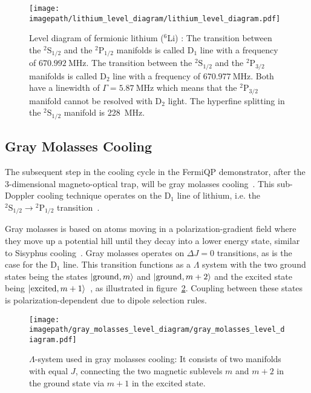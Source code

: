 \begin{figure}
    \centering
    \texttt{[image: \\imagepath/lithium\_level\_diagram/lithium\_level\_diagram.pdf]}
    \caption{Level diagram of fermionic lithium ($^6$Li) \cite{gehm_properties_2003, scherf_re-measurement_1996}: The transition between the  $^2\text{S}_{1/2}$ and the $^2\text{P}_{1/2}$ manifolds is called D$_1$ line with a frequency of $\SI{670.992}{\mega\hertz}$. The transition between the  $^2\text{S}_{1/2}$ and the $^2\text{P}_{3/2}$ manifolds is called D$_2$ line with a frequency of $\SI{670.977}{\mega\hertz}$. Both have a linewidth of $\Gamma = \SI{5.87}{\mega\hertz}$ which means that the $^2\text{P}_{3/2}$ manifold cannot be resolved with D$_2$ light. The hyperfine splitting in the $^2\text{S}_{1/2}$ manifold is \SI{228}{\mega\hertz}.}
    \label{fig:lithium_level_diagram}
\end{figure}

\subsection*{Gray Molasses Cooling}
The subsequent step in the cooling cycle in the FermiQP demonstrator, after the 3-dimensional magneto-optical trap, will be gray molasses cooling~\cite{grynberg_proposal_1994,weidemuller_novel_1994}. This sub-Doppler cooling technique operates on the D$_1$ line of lithium, i.e. the $^2\text{S}_{1/2} \rightarrow {^2\text{P}_{1/2}}$ transition~\cite{burchianti_efficient_2014}.

Gray molasses is based on atoms moving in a polarization-gradient field where they move up a potential hill until they decay into a lower energy state, similar to Sisyphus cooling~\cite{foot_atomic_2005}. Gray molasses operates on $\Delta J = 0$ transitions, as is the case for the D$_1$ line. This transition functions as a $\Lambda$ system with the two ground states being the states $\Ket{\text{ground}, m}$ and $\Ket{\text{ground}, m + 2}$ and the excited state being $\Ket{\text{excited}, m + 1}$~\cite{weidemuller_novel_1994}, as illustrated in figure~\ref{fig:gray_molasses_level_diagram}. Coupling between these states is polarization-dependent due to dipole selection rules.
\begin{figure}
    \centering
    \texttt{[image: \\imagepath/gray\_molasses\_level\_diagram/gray\_molasses\_level\_diagram.pdf]}
    \caption{$\Lambda$-system used in gray molasses cooling: It consists of two manifolds with equal $J$, connecting the two magnetic sublevels $m$ and $m+2$ in the ground state via $m+1$ in the excited state.}
    \label{fig:gray_molasses_level_diagram}
\end{figure}

